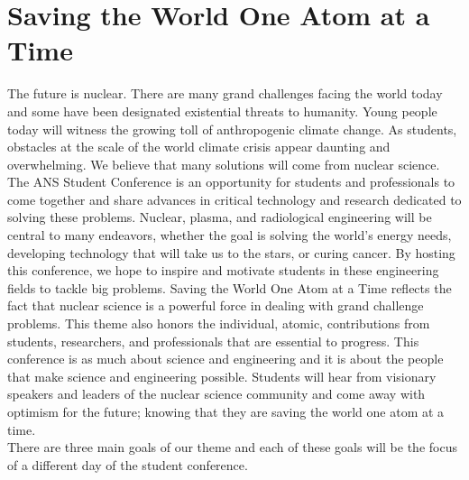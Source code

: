 \section{Saving the World One Atom at a Time}
The future is nuclear. There are many grand challenges facing the world today and some have been designated existential threats to humanity. Young people today will witness the growing toll of anthropogenic climate change. As students, obstacles at the scale of the world climate crisis appear daunting and overwhelming. We believe that many solutions will come from nuclear science. The ANS Student Conference is an opportunity for students and professionals to come together and share advances in critical technology and research dedicated to solving these problems. Nuclear, plasma, and radiological engineering will be central to many endeavors, whether the goal is solving the world’s energy needs, developing technology that will take us to the stars, or curing cancer. By hosting this conference, we hope to inspire and motivate students in these engineering fields to tackle big problems. Saving the World One Atom at a Time reflects the fact that nuclear science is a powerful force in dealing with grand challenge problems. This theme also honors the individual, atomic, contributions from students, researchers, and professionals that are essential to progress. This conference is as much about science and engineering and it is about the people that make science and engineering possible. Students will hear from visionary speakers and leaders of the nuclear science community and come away with optimism for the future; knowing that they are saving the world one atom at a time.\\
There are three main goals of our theme and each of these goals will be the focus of a different day of the student conference.
